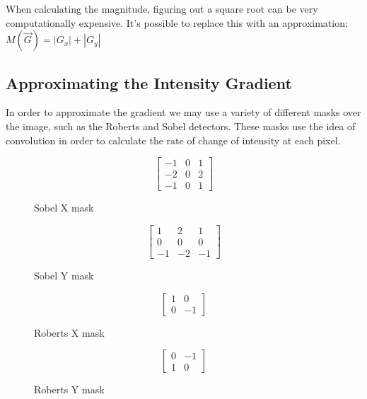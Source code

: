 \documentclass{article}
\begin{document}
	When calculating the magnitude, figuring out a square root can be very computationally expensive. It's possible to replace this with an approximation: $M(\overrightarrow{G}) = |G_{x}| + |G_{y}|$
	
	\subsection{Approximating the Intensity Gradient}
	In order to approximate the gradient we may use a variety of different masks over the image, such as the Roberts and Sobel detectors. These masks use the idea of convolution in order to calculate the rate of change of intensity at each pixel. 
	
	\begin{figure}[ht]
		\begin{minipage}[b]{.23\textwidth}
			\begingroup
			\renewcommand*{\arraystretch}{1.7}	
			\centering
			\[ \begin{bmatrix} -1 & 0 & 1 \\
								-2 & 0 & 2 \\
								-1 & 0 & 1
			\end{bmatrix} \]
			\endgroup
			\caption{Sobel X mask}
			\label{fig:sobel x mask}
		\end{minipage}
		\hfill
		\begin{minipage}[b]{.23\textwidth}
			\begingroup
			\renewcommand*{\arraystretch}{1.7}	
			\centering
			\[ \begin{bmatrix} 1 & 2 & 1 \\
								0 & 0 & 0 \\
								-1 & -2 & -1
			\end{bmatrix} \]
			\endgroup
			\caption{Sobel Y mask}
			\label{fig:sobel y mask}
		\end{minipage}
		\hfill
		\begin{minipage}[b]{.23\textwidth}
			\begingroup
			\renewcommand*{\arraystretch}{1.7}	
			\centering
			\[ \begin{bmatrix} 1 & 0 \\
								0 & -1
			\end{bmatrix} \]
			\endgroup
			\caption{Roberts X mask}
			\label{fig:roberts x mask}
		\end{minipage}
		\hfill
		\begin{minipage}[b]{.23\textwidth}
			\begingroup
			\renewcommand*{\arraystretch}{1.7}	
			\centering
			\[ \begin{bmatrix} 0 & -1 \\
								1 & 0
			\end{bmatrix} \]
			\endgroup
			\caption{Roberts Y mask}
			\label{fig:roberts y mask}
		\end{minipage}
		
	\end{figure}
	
\end{document}
